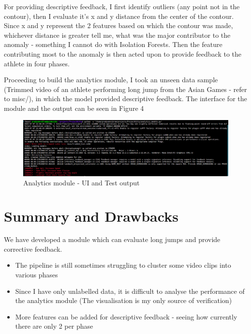 \documentclass[12pt, letterpaper]{article}
\begin{document}
For providing descriptive feedback, I first identify outliers (any point not in the contour), then I evaluate it's x and y distance from the center of the contour. Since x and y represent the 2 features based on which the contour was made, whichever distance is greater tell me, what was the major contributor to the anomaly - something I cannot do with Isolation Forests. Then the feature contributing most to the anomaly is then acted upon to provide feedback to the athlete in four phases.

Proceeding to build the analytics module, I took an unseen data sample (Trimmed video of an athlete performing long jump from the Asian Games - refer to misc/), in which the model provided descriptive feedback. The interface for the module and the output can be seen in Figure 4

\begin{figure}[htbp]
    \includegraphics[width = 1.2\textwidth]{plots/result.png}
    \caption{Analytics module - UI and Test output}
\end{figure}

\section{Summary and Drawbacks}
We have developed a module which can evaluate long jumps and provide corrective feedback.
\begin{itemize}
    \item The pipeline is still sometimes struggling to cluster some video clips into various phases
    \item Since I have only unlabelled data, it is difficult to analyse the performance of the analytics module (The visualisation is my only source of verification)
    \item More features can be added for descriptive feedback - seeing how currently there are only 2 per phase
\end{itemize} 
\end{document}
